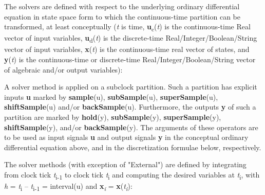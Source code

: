 \documentclass[10pt,a4paper]{report}
\begin{document}
The solvers are defined with respect to the underlying ordinary
differential equation in state space form to which the continuous-time
partition can be transformed, at least conceptually (\emph{t} is time,
\textbf{u}\textsubscript{c}(\emph{t}) is the continuous-time Real vector
of input variables, \textbf{u}\textsubscript{d}(\emph{t}) is the
discrete-time Real/Integer/Boolean/String vector of input variables,
\textbf{x}(\emph{t}) is the continuous-time real vector of states, and
\textbf{y}(\emph{t}) is the continuous-time or discrete-time
Real/Integer/Boolean/String vector of algebraic and/or output
variables):

A solver method is applied on a subclock partition. Such a partition has
explicit inputs \textbf{u} marked by \textbf{sample}(u),
\textbf{subSample}(u), \textbf{superSample}(u), \textbf{shiftSample}(u)
and/or \textbf{backSample}(u). Furthermore, the outputs \textbf{y} of
such a partition are marked by \textbf{hold}(y), \textbf{subSample}(y),
\textbf{superSample}(y), \textbf{shiftSample}(y), and/or
\textbf{backSample}(y). The arguments of these operators are to be used
as input signals \textbf{u} and output signals \textbf{y} in the
conceptual ordinary differential equation above, and in the
discretization formulae below, respectively.

The solver methods (with exception of "External") are defined by
integrating from clock tick \emph{t}\textsubscript{i-1} to clock tick
\emph{t}\textsubscript{i} and computing the desired variables at
\emph{t}\textsubscript{i}, with \emph{h} = \emph{t}\textsubscript{i} --
\emph{t}\textsubscript{i-1} = interval(u) and
\textbf{x}\emph{\textsubscript{i}} =
\textbf{x}(\emph{t\textsubscript{i}}):
\end{document}
